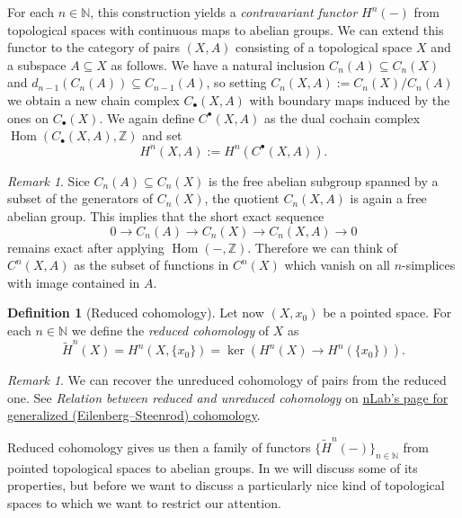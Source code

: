 \documentclass[12pt,a4paper]{amsart}
\theoremstyle{plain}
\theoremstyle{definition}
\newtheorem{defn}[thm]{Definition}
\theoremstyle{remark}
\newtheorem{rem}[thm]{Remark}
\begin{document}
For each $n \in \mathbb{N}$, this construction yields a \emph{contravariant functor} $H^{n}(-)$ from topological spaces with continuous maps to abelian groups.
We can extend this functor to the category of pairs $(X,A)$ consisting of a topological space $X$ and a subspace $A \subseteq X$ as follows.
We have a natural inclusion $C_{n}(A) \subseteq C_{n}(X)$ and $d_{n-1}(C_{n}(A)) \subseteq C_{n-1}(A)$, so setting $C_{n}(X,A) := C_{n}(X)/C_{n}(A)$ we obtain a new chain complex $C_{\bullet}(X,A)$ with boundary maps induced by the ones on $C_{\bullet}(X)$.
We again define $C^{\bullet}(X,A)$ as the dual cochain complex $\operatorname{Hom}(C_{\bullet}(X,A),\mathbb{Z})$ and set
\[ H^{n}(X,A) := H^{n}(C^{\bullet}(X,A)). \]

\begin{rem}
  Sice $C_{n}(A) \subseteq C_{n}(X)$ is the free abelian subgroup spanned by a subset of the generators of $C_{n}(X)$, the quotient $C_{n}(X,A)$ is again a free abelian group.
  This implies that the short exact sequence
  \[ 0 \to C_{n}(A) \to C_{n}(X) \to C_{n}(X,A) \to 0 \]
  remains exact after applying $\operatorname{Hom}(-,\mathbb{Z})$.
  Therefore we can think of $C^{n}(X,A)$ as the subset of functions in $C^{n}(X)$ which vanish on all $n$-simplices with image contained in $A$.
\end{rem}

\begin{defn}[Reduced cohomology]
  Let now $(X,x_{0})$ be a pointed space.
  For each $n \in \mathbb{N}$ we define the \emph{reduced cohomology} of $X$ as
  \[ \tilde{H}^{n}(X) = H^{n}(X,\{x_{0}\}) = \ker(H^{n}(X) \to H^{n}(\{x_{0}\})). \]
\end{defn}

\begin{rem}
  We can recover the unreduced cohomology of pairs from the reduced one.
  See \emph{Relation between reduced and unreduced cohomology} on \href{https://ncatlab.org/nlab/show/generalized+\%28Eilenberg-Steenrod\%29+cohomology\#RelationBetweenReducedAndUnreduced}{nLab's page for generalized (Eilenberg--Steenrod) cohomology}.
\end{rem}

Reduced cohomology gives us then a family of functors $\{ \tilde{H}^{n}(-) \}_{n \in \mathbb{N}}$ from pointed topological spaces to abelian groups.
In  we will discuss some of its properties, but before we want to discuss a particularly nice kind of topological spaces to which we want to restrict our attention.
\end{document}
